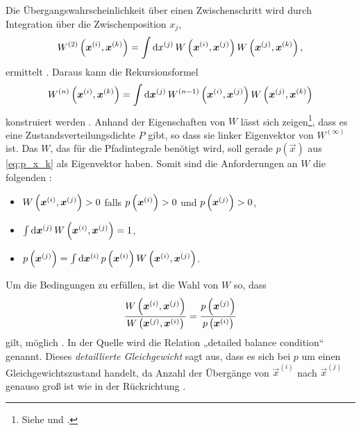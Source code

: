 
Die Übergangswahrscheinlichkeit über einen Zwischenschritt wird durch
Integration über die Zwischenposition $x_j$,
\[
    W^{(2)}\del{\vec x^{(i)}, \vec x^{(k)}} = \int \dif x^{(j)} \, W\del{\vec
    x^{(i)}, \vec x^{(j)}} W\del{\vec x^{(j)}, \vec x^{(k)}},
\]
ermittelt \parencite[(3.9)]{Creutz/Statistical_Approach_QM}. Daraus kann die
Rekursionsformel
\[
    W^{(n)}\del{\vec x^{(i)}, \vec x^{(k)}} = \int \dif \vec x^{(j)} \,
    W^{(n-1)}\del{\vec x^{(i)},
    \vec x^{(j)}} W\del{\vec x^{(j)}, \vec x^{(k)}}
\]
konstruiert werden \parencite[(3.10)]{Creutz/Statistical_Approach_QM}. Anhand
der Eigenschaften von $W$ lässt sich zeigen\footnote{Siehe
\parencite[435]{Creutz/Statistical_Approach_QM} und
\parencite[Anhang~B]{Creutz/Statistical_Approach_QM}.}, dass es eine
Zustandsverteilungsdichte $P$ gibt, so dass sie linker Eigenvektor von
$W^{(\infty)}$ ist. Das $W$, das für die Pfadintegrale benötigt wird, soll
gerade $p(\vec x)$ aus \eqref{eq:p_x_k} als Eigenvektor haben. Somit sind die
Anforderungen an $W$ die folgenden
\parencite[(3.18)]{Creutz/Statistical_Approach_QM}:
\begin{itemize}
    \item
        $W\del{\vec x^{(i)}, \vec x^{(j)}} > 0$ falls $p\del{\vec x^{(i)}} > 0$
        und $p\del{\vec x^{(j)}} > 0$,
    \item
        $\int \dif \vec x^{(j)} \, W\del{\vec x^{(i)}, \vec x^{(j)}} = 1$,
    \item
        $p\del{\vec x^{(j)}} = \int \dif \vec x^{(i)} \, p\del{\vec x^{(i)}}
        W\del{\vec x^{(i)}, \vec x^{(j)}}$.
\end{itemize}


Um die Bedingungen zu erfüllen, ist die Wahl von $W$ so, dass
\[
    \frac{W\del{\vec x^{(i)}, \vec x^{(j)}}}{W\del{\vec x^{(j)}, \vec x^{(i)}}}
    = \frac{p\del{\vec x^{(j)}}}{p\del{\vec x^{(i)}}}
\]
gilt, möglich \parencite[(3.23)]{Creutz/Statistical_Approach_QM}. In der Quelle
wird die Relation „detailed balance condition“ genannt. Dieses
\emph{detaillierte Gleichgewicht} sagt aus, dass es sich bei $p$ um einen
Gleichgewichtszustand handelt, da Anzahl der Übergänge von $\vec x^{(i)}$ nach
$\vec x^{(j)}$ genauso groß ist wie in der Rückrichtung
\parencite[85]{Schwabl/Quantenmechanik_fuer_Fortgeschrittene}.

